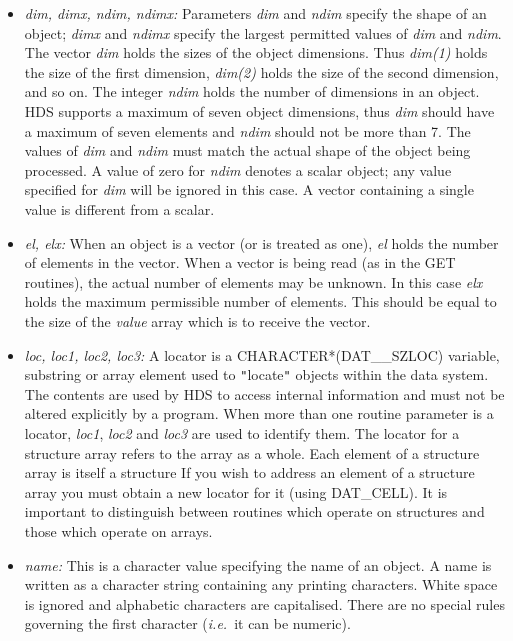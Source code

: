 \documentclass[11pt]{article}
\newcommand{\htmlref}[2]{#1}
\newcommand{\qt}[1]{``#1''}
\newcommand{\st}[1]{{\em{#1}}}
\newcommand{\astar}[0]{{$*$}}
\renewcommand{\qt}[1]{{\tt{"}}#1{\tt{"}}}
\renewcommand{\astar}[0]{*}
\begin{document}
\begin{itemize}

\item \st{dim, dimx, ndim, ndimx:}
Parameters \st{dim} and \st{ndim} specify the \htmlref{shape}{sect:shape} of an object;
\st{dimx} and \st{ndimx} specify the largest permitted values of
\st{dim} and \st{ndim}. The vector \st{dim} holds the sizes of the
object dimensions. Thus \st{dim(1)} holds the size of the first
dimension, \st{dim(2)} holds the size of the second dimension, and so
on. The integer \st{ndim} holds the number of dimensions in an
object. HDS supports a maximum of seven object dimensions, thus
\st{dim} should have a maximum of seven elements and \st{ndim} should
not be more than 7. The values of \st{dim} and \st{ndim} must match
the actual shape of the object being processed. A value of zero for
\st{ndim} denotes a scalar object; any value specified for \st{dim}
will be ignored in this case. A vector containing a single value is
different from a scalar.

\item \st{el, elx:}
When an object is a vector (or is treated as one), \st{el} holds the
number of elements in the vector. When a vector is being read (as in
the GET routines), the actual number of elements may be unknown. In
this case \st{elx} holds the maximum permissible number of
elements. This should be equal to the size of the \st{value} array
which is to receive the vector.

\item \st{loc, loc1, loc2, loc3:}
A \htmlref{locator}{sect:locators} is a CHARACTER{\astar}(DAT\_\_SZLOC)
variable, substring or array element used to \qt{locate} objects
within the data system. The contents are used by HDS to access
internal information and must not be altered explicitly by a program.
When more than one routine parameter is a locator, \st{loc1},
\st{loc2} and \st{loc3} are used to identify them. The locator for a
structure array refers to the array as a whole. Each element of a
structure array is itself a structure If you wish to address an
element of a structure array you must obtain a new locator for it
(using \htmlref{DAT\_CELL}{DAT_CELL}). It is important to distinguish
between routines which operate on structures and those which operate
on arrays.

\item \htmlref{\st{name:}}{sect:name}
This is a character value specifying the name of an object. A name is
written as a character string containing any printing
characters. White space is ignored and alphabetic characters are
capitalised. There are no special rules governing the first character
(\st{i.e.}\ it can be numeric).


\end{itemize}
\end{document}
